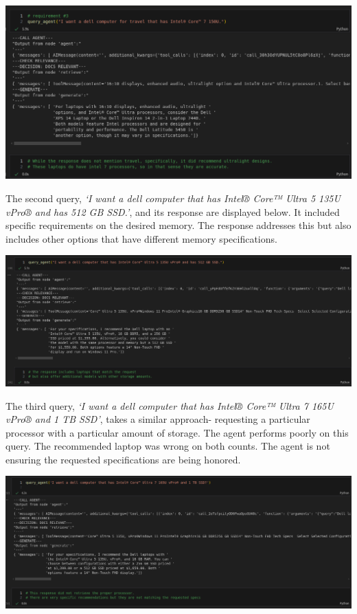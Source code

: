 \documentclass[11pt,letterpaper]{article}
\begin{document}
\begin{center}
    \includegraphics[width=1.0\linewidth]{q1.png}
\end{center}

The second query, \textit{`I want a dell computer that has Intel® Core™ Ultra 5 135U vPro® and has 512 GB SSD.'}, and its response are displayed below. It included specific requirements on the desired memory. The response addresses this but also includes other options that have different memory specifications. 

\begin{center}
    \includegraphics[width=1.0\linewidth]{q2.png}
\end{center}

The third query, \textit{`I want a dell computer that has Intel® Core™ Ultra 7 165U vPro® and 1 TB SSD'}, takes a similar approach- requesting a particular processor with a particular amount of storage.
The agent performs poorly on this query. The recommended laptop was wrong on both counts. The agent is not ensuring the requested specifications are being honored.

\begin{center}
    \includegraphics[width=1.0\linewidth]{q3.png}
\end{center}
\end{document}
